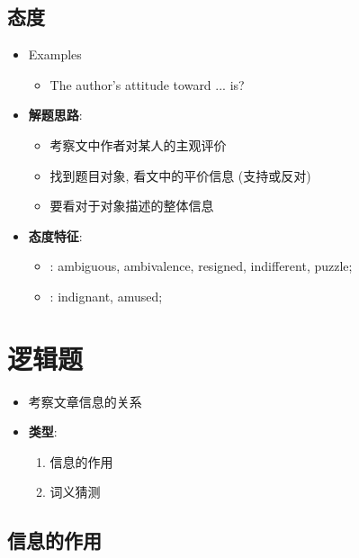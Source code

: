   \subsection{态度}

    \begin{itemize}
      \item Examples
      \begin{itemize}
        \item The author's attitude toward ... is?
      \end{itemize}

      \item \textbf{解题思路}:
      \begin{itemize}
        \item 考察文中作者对某人的主观评价
        \item 找到题目对象, 看文中的平价信息 (支持或反对)
        \item 要看对于对象描述的整体信息
      \end{itemize}

      \item \textbf{态度特征}:
      \begin{itemize}
        \item {}: ambiguous, ambivalence, resigned,
        indifferent, puzzle;
        \item {}: indignant, amused;
      \end{itemize}
    \end{itemize}

\section{逻辑题}

  \begin{itemize}
    \item 考察文章信息的关系
    \item \textbf{类型}:
    \begin{enumerate}
      \item 信息的作用
      \item 词义猜测
    \end{enumerate}
  \end{itemize}

  \subsection{信息的作用}

